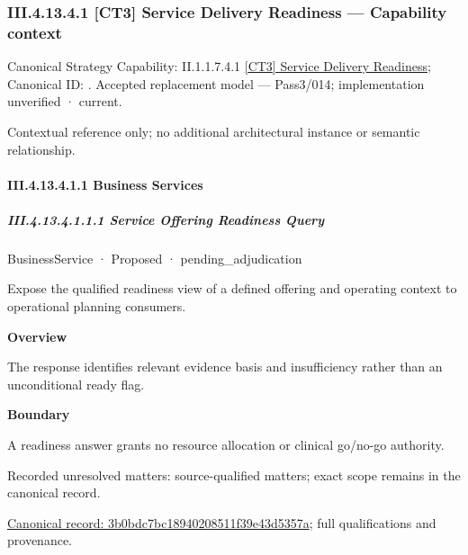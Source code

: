 \subsubsection*{III.4.13.4.1 [CT3] Service Delivery Readiness — Capability context}
\label{navigation:III.4.13.4.1}

{\small Canonical Strategy Capability: II.1.1.7.4.1 \hyperref[element:cfce47b7e3c1424eba10348f9eb7ea9c]{[CT3] Service Delivery Readiness}; Canonical ID: \texttt{}. Accepted replacement model — Pass3/014; implementation unverified · current.}\par
Contextual reference only; no additional architectural instance or semantic relationship.\par
\paragraph*{III.4.13.4.1.1 Business Services}
\label{navigation:III.4.13.4.1.1}

\subparagraph*{III.4.13.4.1.1.1 Service Offering Readiness Query}
\label{navigation:III.4.13.4.1.1.1}

\label{element:3b0bdc7bc18940208511f39e43d5357a}
{\small BusinessService · Proposed · pending\_adjudication}\par

Expose the qualified readiness view of a defined offering and operating context to operational planning consumers.



\textbf{Overview}



The response identifies relevant evidence basis and insufficiency rather than an unconditional ready flag.



\textbf{Boundary}



A readiness answer grants no resource allocation or clinical go/no-go authority.


{\small Recorded unresolved matters: source-qualified matters; exact scope remains in the canonical record.}\par
{\footnotesize \href{../../../../continuum/business/business-service/3b0bdc7bc18940208511f39e43d5357a.md}{Canonical record: 3b0bdc7bc18940208511f39e43d5357a}; full qualifications and provenance.}\par
